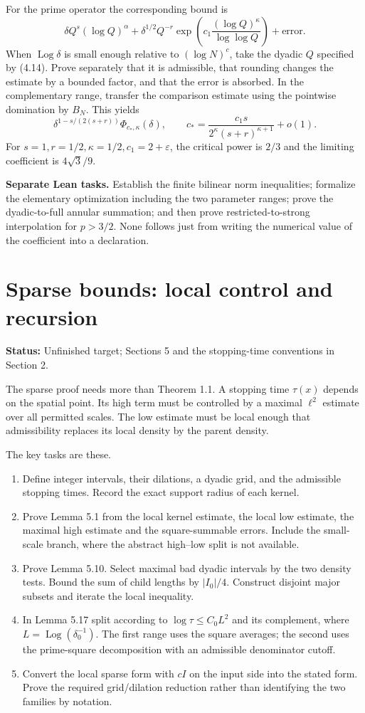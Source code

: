 \documentclass[11pt]{article}
\newcommand{\status}[1]{\textbf{Status:} #1.}
\newcommand{\page}{\newpage}
\begin{document}
For the prime operator the corresponding bound is
\[
 \delta Q^s(\log Q)^\alpha+
 \delta^{1/2}Q^{-r}
 \exp\!\left(c_1\frac{(\log Q)^\kappa}{\log\log Q}\right)
 +\text{error}.
\]
When \(\operatorname{Log}\delta\) is small enough relative to \((\log N)^c\),
take the dyadic \(Q\) specified by (4.14). Prove separately that it is admissible,
that rounding changes the estimate by a bounded factor, and that the error is
absorbed. In the complementary range, transfer the comparison estimate using the
pointwise domination by \(B_N\). This yields
\[
 \delta^{1-s/(2(s+r))}\Phi_{c_*,\kappa}(\delta),\qquad
 c_* = \frac{c_1s}{2^\kappa(s+r)^{\kappa+1}}+o(1).
\]
For \(s=1,r=1/2,\kappa=1/2,c_1=2+\varepsilon\), the critical power is \(2/3\)
and the limiting coefficient is \(4\sqrt3/9\).

\textbf{Separate Lean tasks.} Establish the finite bilinear norm inequalities;
formalize the elementary optimization including the two parameter ranges; prove
the dyadic-to-full annular summation; and then prove restricted-to-strong
interpolation for \(p>3/2\). None follows just from writing the numerical value
of the coefficient into a declaration.

\page
\section{Sparse bounds: local control and recursion}
\status{Unfinished target; Sections 5 and the stopping-time conventions in Section 2}

The sparse proof needs more than Theorem 1.1. A stopping time \(\tau(x)\) depends
on the spatial point. Its high term must be controlled by a maximal \(\ell^2\)
estimate over all permitted scales. The low estimate must be local enough that
admissibility replaces its local density by the parent density.

The key tasks are these.
\begin{enumerate}
\item Define integer intervals, their dilations, a dyadic grid, and the admissible
stopping times. Record the exact support radius of each kernel.
\item Prove Lemma 5.1 from the local kernel estimate, the local low estimate, the
maximal high estimate and the square-summable errors. Include the small-scale
branch, where the abstract high--low split is not available.
\item Prove Lemma 5.10. Select maximal bad dyadic intervals by the two density
tests. Bound the sum of child lengths by \(|I_0|/4\). Construct disjoint major
subsets and iterate the local inequality.
\item In Lemma 5.17 split according to \(\log\tau\le C_0L^2\) and its complement,
where \(L=\operatorname{Log}(\delta_0^{-1})\). The first range uses the square
averages; the second uses the prime-square decomposition with an admissible
denominator cutoff.
\item Convert the local sparse form with \(cI\) on the input side into the stated
form. Prove the required grid/dilation reduction rather than identifying the
two families by notation.
\end{enumerate}
\end{document}
